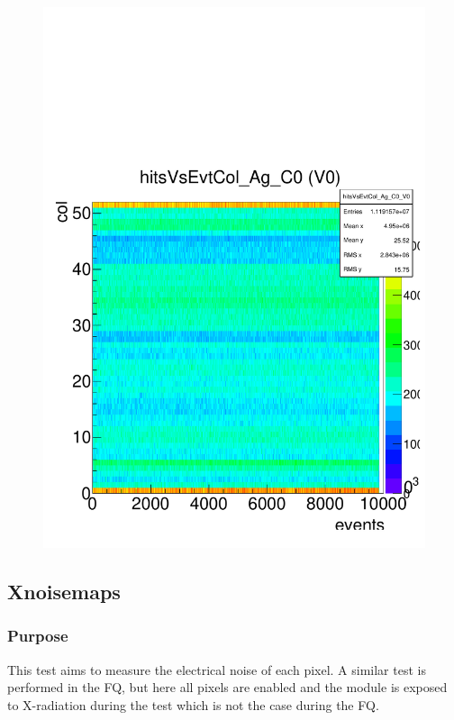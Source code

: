 \documentclass[a4paper,12pt,twoside]{article}
\begin{document}
\begin{figure} [h!]
\begin{minipage}{.48\textwidth}
  \includegraphics[width=\textwidth]{./Figures/HRData_HitsEventColumn.pdf}
  \label{HRData-HitsEventColumn}
\end{minipage}
\end{figure}


\subsection{Xnoisemaps}
\subsubsection{Purpose}
This test aims to measure the electrical noise of each pixel. A similar test is performed in the FQ, but here all pixels are enabled and the module is exposed to X-radiation during the test which is not the case during the FQ.
\end{document}
